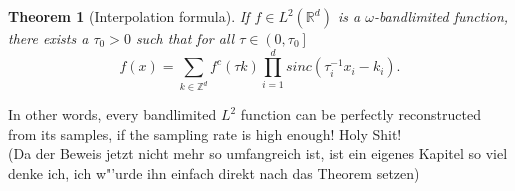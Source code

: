 \documentclass[a4paper, 11pt]{scrreprt}
\newtheorem{theorem}[defi]{Theorem}
\newcommand{\RR}{\mathbb{R}}
\newcommand{\ZZ}{\mathbb{Z}}
\begin{document}
\begin{theorem}[Interpolation formula]
\label{th:interpolation}
If \(f \in L^2(\RR^d)\) is a \(\omega\)-bandlimited function, there exists a \(\tau_0 > 0\) such that for all \(\tau \in \left(0,\tau_0\right]\)
\begin{equation}
	f(x) = \sum_{k \in \ZZ^d} f^c(\tau k) \prod_{i=1}^d sinc\left(\tau_i^{-1} x_i -k_i\right).
\end{equation}
\end{theorem}
In other words, every bandlimited \(L^2\) function can be perfectly reconstructed from its samples, if the sampling rate is high enough! Holy Shit!\\
(Da der Beweis jetzt nicht mehr so umfangreich ist, ist ein eigenes Kapitel so viel denke ich, ich w"'urde ihn einfach direkt nach das Theorem setzen)\\
\end{document}
